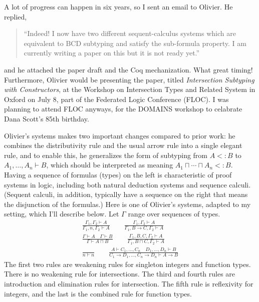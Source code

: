 \documentclass{article}
\begin{document}
A lot of progress can happen in six years, so I sent an email to
Olivier. He replied,
\begin{quote}
``Indeed! I now have two different sequent-calculus systems which are
  equivalent to BCD subtyping and satisfy the sub-formula property.  I
  am currently writing a paper on this but it is not ready yet.''
\end{quote}
and he attached the paper draft and the Coq mechanization. What great
timing!  Furthermore, Olivier would be presenting the paper, titled
\emph{Intersection Subtyping with Constructors}, at the Workshop on
Intersection Types and Related System in Oxford on July 8, part of the
Federated Logic Conference (FLOC). I was planning to attend FLOC
anyways, for the DOMAINS workshop to celabrate Dana Scott's 85th
birthday.

Olivier's systems makes two important changes compared to prior work:
he combines the distributivity rule and the usual arrow rule into a
single elegant rule, and to enable this, he generalizes the form of
subtyping from $A <: B$ to $A_1,\ldots,A_n \vdash B$, which should be
interpreted as meaning $A_1 \sqcap \cdots \sqcap A_n <: B$.  Having a
sequence of formulas (types) on the left is characteristic of proof
systems in logic, including both natural deduction systems and
sequence calculi. (Sequent calculi, in addition, typically have a
sequence on the right that means the disjunction of the formulas.)
Here is one of Olivier's systems, adapted to my setting, which I'll
describe below. Let $\Gamma$ range over sequences of types.
\begin{gather*}
  \frac{\Gamma_1, \Gamma_2 \vdash A}
       {\Gamma_1 , n, \Gamma_2 \vdash A} \qquad
  \frac{\Gamma_1, \Gamma_2 \vdash A}
       {\Gamma_1 , B \to C, \Gamma_2 \vdash A}
   \\[2ex]
   \frac{\Gamma \vdash A \quad \Gamma \vdash B}{\Gamma \vdash A \sqcap B}
   \qquad
   \frac{\Gamma_1,B,C,\Gamma_2 \vdash A}{\Gamma_1,B\sqcap C,\Gamma_2 \vdash A}
   \\[2ex]
   \frac{}{n \vdash n}
   \qquad
   \frac{A \vdash C_1, \ldots, C_n \quad
         D_1, \ldots, D_n \vdash B}
        {C_1\to D_1,\ldots, C_n\to D_n \vdash A \to B}
\end{gather*}
The first two rules are weakening rules for singleton integers and
function types. There is no weakening rule for intersections.  The
third and fourth rules are introduction and elimination rules for
intersection. The fifth rule is reflexivity for integers, and the last
is the combined rule for function types.
\end{document}

